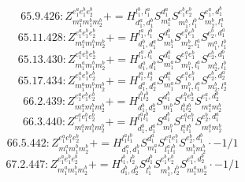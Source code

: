 \documentclass[letterpaper,10pt,fleqn,leqno,onecolumn]{article}
\begin{document}
\begin{equation} \;\;\;\;\;\;  65.9.426: Z^{e_{1}^{a}e_{1}^{b}e_{2}^{b}}_{m_{1}^{a}m_{1}^{b}m_{2}^{b}}+=H^{l_{1}^{b},l_{1}^{a}}_{d_{1}^{a},d_{1}^{b}}S^{d_{1}^{a}}_{m_{1}^{a}}S^{e_{1}^{b}e_{2}^{b}}_{m_{1}^{b},l_{1}^{b}}S^{e_{1}^{a},d_{1}^{b}}_{m_{2}^{b},l_{1}^{a}} \end{equation}
\begin{equation} \;\;\;\;\;\;  65.11.428: Z^{e_{1}^{a}e_{1}^{b}e_{2}^{b}}_{m_{1}^{a}m_{1}^{b}m_{2}^{b}}+=H^{l_{1}^{a},l_{1}^{b}}_{d_{1}^{b},d_{1}^{a}}S^{d_{1}^{b}}_{m_{1}^{b}}S^{e_{1}^{a}e_{1}^{b}}_{m_{2}^{b},l_{1}^{a}}S^{e_{2}^{b},d_{1}^{a}}_{m_{1}^{a},l_{1}^{b}} \end{equation}
\begin{equation} \;\;\;\;\;\;  65.13.430: Z^{e_{1}^{a}e_{1}^{b}e_{2}^{b}}_{m_{1}^{a}m_{1}^{b}m_{2}^{b}}+=H^{l_{1}^{a},l_{1}^{b}}_{d_{1}^{a},d_{1}^{b}}S^{d_{1}^{a}}_{m_{1}^{a}}S^{e_{1}^{a}e_{1}^{b}}_{m_{1}^{b},l_{1}^{a}}S^{e_{2}^{b},d_{1}^{b}}_{m_{2}^{b},l_{1}^{b}} \end{equation}
\begin{equation} \;\;\;\;\;\;  65.17.434: Z^{e_{1}^{a}e_{1}^{b}e_{2}^{b}}_{m_{1}^{a}m_{1}^{b}m_{2}^{b}}+=H^{l_{1}^{a},l_{2}^{a}}_{d_{1}^{a},d_{2}^{a}}S^{d_{1}^{a}}_{m_{1}^{a}}S^{e_{1}^{a}e_{1}^{b}}_{m_{1}^{b},l_{1}^{a}}S^{e_{2}^{b},d_{2}^{a}}_{m_{2}^{b},l_{2}^{a}} \end{equation}
\begin{equation} \;\;\;\;\;\;  66.2.439: Z^{e_{1}^{a}e_{1}^{b}e_{2}^{b}}_{m_{1}^{a}m_{1}^{b}m_{2}^{b}}+=H^{l_{1}^{b}l_{2}^{b}}_{d_{1}^{b},d_{2}^{b}}S^{d_{1}^{b}}_{m_{1}^{b}}S^{e_{1}^{b}e_{2}^{b}}_{l_{1}^{b}l_{2}^{b}}S^{e_{1}^{a},d_{2}^{b}}_{m_{1}^{a}m_{2}^{b}} \end{equation}
\begin{equation} \;\;\;\;\;\;  66.3.440: Z^{e_{1}^{a}e_{1}^{b}e_{2}^{b}}_{m_{1}^{a}m_{1}^{b}m_{2}^{b}}+=H^{l_{1}^{a}l_{1}^{b}}_{d_{1}^{b},d_{1}^{a}}S^{d_{1}^{b}}_{m_{1}^{b}}S^{e_{1}^{a}e_{1}^{b}}_{l_{1}^{a}l_{1}^{b}}S^{e_{2}^{b},d_{1}^{a}}_{m_{1}^{a}m_{2}^{b}} \end{equation}
\begin{equation} \;\;\;\;\;\;  66.5.442: Z^{e_{1}^{a}e_{1}^{b}e_{2}^{b}}_{m_{1}^{a}m_{1}^{b}m_{2}^{b}}+=H^{l_{1}^{a}l_{1}^{b}}_{d_{1}^{a},d_{1}^{b}}S^{d_{1}^{a}}_{m_{1}^{a}}S^{e_{1}^{a}e_{1}^{b}}_{l_{1}^{a}l_{1}^{b}}S^{e_{2}^{b},d_{1}^{b}}_{m_{1}^{b}m_{2}^{b}}\cdot -1/1 \end{equation}
\begin{equation} \;\;\;\;\;\;  67.2.447: Z^{e_{1}^{a}e_{1}^{b}e_{2}^{b}}_{m_{1}^{a}m_{1}^{b}m_{2}^{b}}+=H^{l_{1}^{b},l_{2}^{b}}_{d_{1}^{b},d_{2}^{b}}S^{d_{1}^{b}}_{l_{1}^{b}}S^{e_{1}^{b}e_{2}^{b}}_{m_{1}^{b},l_{2}^{b}}S^{e_{1}^{a},d_{2}^{b}}_{m_{1}^{a}m_{2}^{b}}\cdot -1/1 \end{equation}
\end{document}
